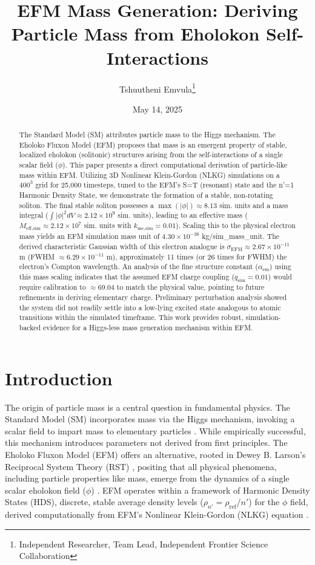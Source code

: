 \documentclass[11pt]{article}
\title{EFM Mass Generation: Deriving Particle Mass from Eholokon Self-Interactions}
\author{Tshuutheni Emvula\thanks{Independent Researcher, Team Lead, Independent Frontier Science Collaboration}}
\date{May 14, 2025}
\begin{document}
\maketitle

\begin{abstract}
The Standard Model (SM) attributes particle mass to the Higgs mechanism. The Eholoko Fluxon Model (EFM) proposes that mass is an emergent property of stable, localized eholokon (solitonic) structures arising from the self-interactions of a single scalar field (\(\phi\)). This paper presents a direct computational derivation of particle-like mass within EFM. Utilizing 3D Nonlinear Klein-Gordon (NLKG) simulations on a \(400^3\) grid for 25,000 timesteps, tuned to the EFM's S=T (resonant) state and the n'=1 Harmonic Density State, we demonstrate the formation of a stable, non-rotating soliton. The final stable soliton possesses a \(\max(|\phi|) \approx 8.13\) sim. units and a mass integral (\(\int|\phi|^2 dV \approx 2.12 \times 10^9\) sim. units), leading to an effective mass (\(M_{\text{eff,sim}} \approx 2.12 \times 10^7\) sim. units with \(k_{\text{mc,sim}}=0.01\)). Scaling this to the physical electron mass yields an EFM simulation mass unit of \(4.30 \times 10^{-38}\) kg/sim\_mass\_unit. The derived characteristic Gaussian width of this electron analogue is \( \sigma_{\text{EFM}} \approx 2.67 \times 10^{-11} \) m (FWHM \(\approx 6.29 \times 10^{-11}\) m), approximately 11 times (or 26 times for FWHM) the electron's Compton wavelength. An analysis of the fine structure constant (\(\alpha_{\text{em}}\)) using this mass scaling indicates that the assumed EFM charge coupling (\(q_{\text{sim}}=0.01\)) would require calibration to \( \approx 69.04 \) to match the physical value, pointing to future refinements in deriving elementary charge. Preliminary perturbation analysis showed the system did not readily settle into a low-lying excited state analogous to atomic transitions within the simulated timeframe. This work provides robust, simulation-backed evidence for a Higgs-less mass generation mechanism within EFM.
\end{abstract}

\section{Introduction}
The origin of particle mass is a central question in fundamental physics. The Standard Model (SM) incorporates mass via the Higgs mechanism, invoking a scalar field to impart mass to elementary particles \citep{SMReviewPlaceholder}. While empirically successful, this mechanism introduces parameters not derived from first principles. The Eholoko Fluxon Model (EFM) offers an alternative, rooted in Dewey B. Larson's Reciprocal System Theory (RST) \citep{larson1959}, positing that all physical phenomena, including particle properties like mass, emerge from the dynamics of a single scalar eholokon field (\(\phi\)) \citep{emvula2025compendium_intro_oct}. EFM operates within a framework of Harmonic Density States (HDS), discrete, stable average density levels (\(\rho_{n'} = \rho_{\text{ref}}/n'\)) for the \(\phi\) field, derived computationally from EFM's Nonlinear Klein-Gordon (NLKG) equation \citep{emvula2025efm_hds_validated}.
\end{document}
